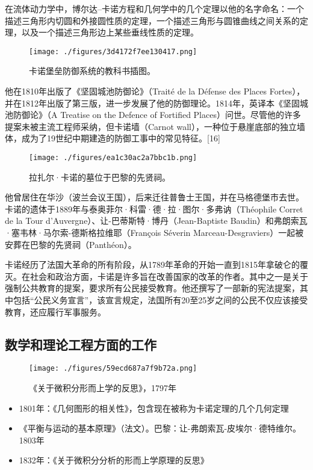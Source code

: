 在流体动力学中，博尔达–卡诺方程和几何学中的几个定理以他的名字命名：一个描述三角形内切圆和外接圆性质的定理，一个描述三角形与圆锥曲线之间关系的定理，以及一个描述三角形边上某些垂线性质的定理。
\begin{figure}[ht]
\centering
\texttt{[image: ./figures/3d4172f7ee130417.png]}
\caption{卡诺堡垒防御系统的教科书插图。} \label{fig_Lazare_4}
\end{figure}
他在1810年出版了《坚固城池防御论》（Traité de la Défense des Places Fortes），并在1812年出版了第三版，进一步发展了他的防御理论。1814年，英译本《坚固城池防御论》（A Treatise on the Defence of Fortified Places）问世。尽管他的许多提案未被主流工程师采纳，但卡诺墙（Carnot wall），一种位于悬崖底部的独立墙体，成为了19世纪中期建造的防御工事中的常见特征。[16]
\begin{figure}[ht]
\centering
\texttt{[image: ./figures/ea1c30ac2a7bbc1b.png]}
\caption{拉扎尔·卡诺的墓位于巴黎的先贤祠。} \label{fig_Lazare_5}
\end{figure}
他曾居住在华沙（波兰会议王国），后来迁往普鲁士王国，并在马格德堡市去世。卡诺的遗体于1889年与泰奥菲尔·科雷·德·拉·图尔·多弗讷（Théophile Corret de la Tour d'Auvergne）、让-巴蒂斯特·博丹（Jean-Baptiste Baudin）和弗朗索瓦·塞韦林·马尔索-德斯格拉维耶（François Séverin Marceau-Desgraviers）一起被安葬在巴黎的先贤祠（Panthéon）。

卡诺经历了法国大革命的所有阶段，从1789年革命的开始一直到1815年拿破仑的覆灭。在社会和政治方面，卡诺是许多旨在改善国家的改革的作者。其中之一是关于强制公共教育的提案，要求所有公民接受教育。他还撰写了一部新的宪法提案，其中包括“公民义务宣言”，该宣言规定，法国所有20至25岁之间的公民不仅应该接受教育，还应履行军事服务。
\subsection{数学和理论工程方面的工作}
\begin{figure}[ht]
\centering
\texttt{[image: ./figures/59ecd687a7f9b72a.png]}
\caption{《关于微积分形而上学的反思》，1797年} \label{fig_Lazare_6}
\end{figure}
\begin{itemize}
\item 1801年：《几何图形的相关性》，包含现在被称为卡诺定理的几个几何定理  
\item 《平衡与运动的基本原理》（法文）。巴黎：让-弗朗索瓦-皮埃尔·德特维尔。1803年  
\item 1832年：《关于微积分分析的形而上学原理的反思》
\end{itemize}